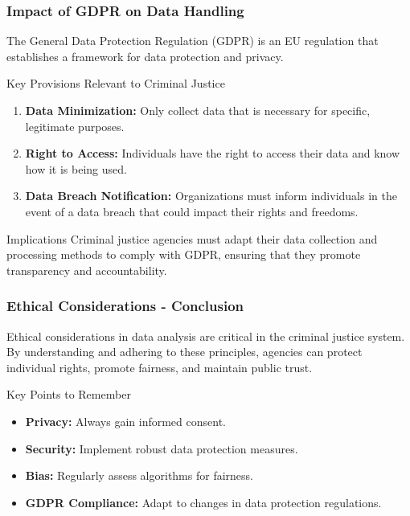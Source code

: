 \documentclass[aspectratio=169]{beamer}
\begin{document}
\begin{frame}[fragile]
    \frametitle{Impact of GDPR on Data Handling}
    The General Data Protection Regulation (GDPR) is an EU regulation that establishes a framework for data protection and privacy.
    
    \begin{block}{Key Provisions Relevant to Criminal Justice}
        \begin{enumerate}
            \item \textbf{Data Minimization:} Only collect data that is necessary for specific, legitimate purposes.
            \item \textbf{Right to Access:} Individuals have the right to access their data and know how it is being used.
            \item \textbf{Data Breach Notification:} Organizations must inform individuals in the event of a data breach that could impact their rights and freedoms.
        \end{enumerate}
    \end{block}

    \begin{block}{Implications}
        Criminal justice agencies must adapt their data collection and processing methods to comply with GDPR, ensuring that they promote transparency and accountability.
    \end{block}
\end{frame}

\begin{frame}[fragile]
    \frametitle{Ethical Considerations - Conclusion}
    Ethical considerations in data analysis are critical in the criminal justice system. 
    By understanding and adhering to these principles, agencies can protect individual rights, promote fairness, and maintain public trust.
    
    \begin{block}{Key Points to Remember}
        \begin{itemize}
            \item \textbf{Privacy:} Always gain informed consent.
            \item \textbf{Security:} Implement robust data protection measures.
            \item \textbf{Bias:} Regularly assess algorithms for fairness.
            \item \textbf{GDPR Compliance:} Adapt to changes in data protection regulations.
        \end{itemize}
    \end{block}
\end{frame}
\end{document}
